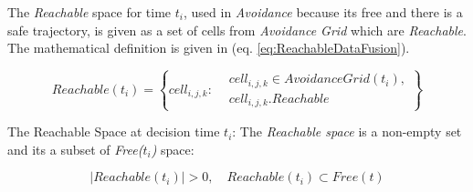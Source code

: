 \noindent The \emph{Reachable} space for time $t_i$, used in \emph{Avoidance} because its free and there is a safe trajectory, is given as a set of cells from \emph{Avoidance Grid} which are \emph{Reachable}. The mathematical definition is given in (eq. \ref{eq:ReachableDataFusion}).

\begin{equation}\label{eq:ReachableDataFusion}
    Reachable(t_i) = \left\{cell_{i,j,k}:\begin{aligned}&cell_{i,j,k}\in AvoidanceGrid(t_i),\\&cell_{i,j,k}.Reachable\end{aligned}\right\}
\end{equation}

\newpage
\begin{note}{The Reachable Space at decision time $t_i$:} 
The \emph{Reachable space} is a non-empty set and its a subset of \emph{Free($t_i$)} space:    

\begin{equation}\label{eq:reachableDataFusionConstraints}
    |Reachable(t_i)| > 0, \quad Reachable(t_i) \subset Free(t)
\end{equation}
\end{note}
